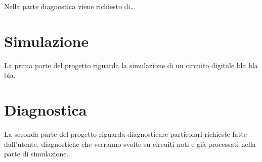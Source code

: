 Nella parte diagnostica viene richiesto di{\ldots}

\chapter{Simulazione}
\label{simulazione}

La prima parte del progetto riguarda la simulazione di un circuito digitale bla
bla bla.

\chapter{Diagnostica}
\label{diagnostica}

La seconda parte del progetto riguarda diagnosticare particolari richieste
fatte dall'utente, diagnostiche che verranno svolte su circuiti noti e già
processati nella parte di simulazione.




